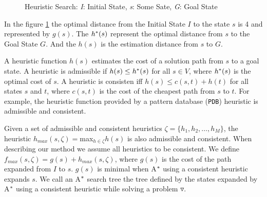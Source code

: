 \begin{figure}[htb]
\centering
{}
\caption{Heuristic Search: \textit{I}: Initial State, \textit{s}: Some Sate, \textit{G}: Goal State} \label{fig:searchSpace}
\end{figure}

In the figure \ref{fig:searchSpace} the optimal distance from the Initial State $I$ to  the state $s$ is 4 and represented by $g(s)$. The $h\sp{*}(s)$ represent the optimal distance from $s$ to the Goal State $G$. And the $h(s)$ is the estimation distance from $s$ to $G$.

A heuristic function $h(s)$ estimates the cost of a solution path from $s$ to a goal state. A heuristic is admissible if $h(s) \leq h\sp{*}(s)$ for all $s \in V$, where $h\sp{*}(s)$ is the optimal cost of $s$. A heuristic is consisten iff $h(s) \leq c(s,t) + h(t)$ for all states $s$ and $t$, where $c(s,t)$ is the cost of the cheapest path from $s$ to $t$. For example, the heuristic function provided by a pattern database (\texttt{PDB}) heuristic \cite{culberson1998pattern} is admissible and consistent.

Given a set of admissible and consistent heuristics $\zeta = \{h_{1}, h_{2}, \dots, h_{M}\}$, the heuristic $h_{max}(s,\zeta) = $max$_{h \in \zeta} h(s)$ is also admissible and consistent. When describing our method we assume all heuristics to be consistent. We define $f_{max}(s, \zeta) = g(s) + h_{max}(s, \zeta)$, where $g(s)$ is the cost of the path expanded from $I$ to $s$. $g(s)$ is minimal when A$\sp{*}$ using a consistent heuristic expands $s$. We call an A$\sp{*}$ search tree the tree defined by the states expanded by A$\sp{*}$ using a consistent heuristic while solving a problem $\triangledown$.

